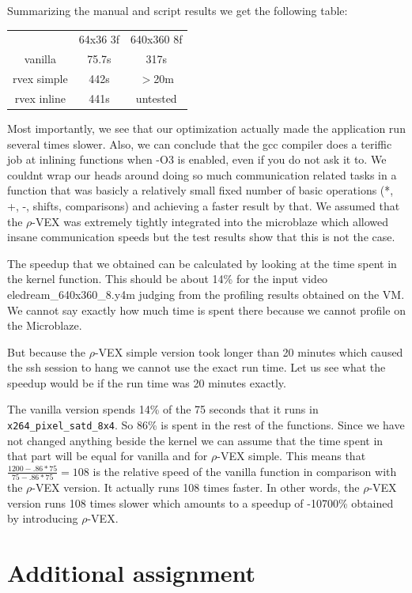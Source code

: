 \documentclass{article}
\newcommand{\rvex}{\ensuremath{\rho}-VEX}
\newcommand{\satd}{\texttt{x264\_pixel\_satd\_8x4}}
\begin{document}
Summarizing the manual and script results we get the following table:

\begin{tabular}{ c | c c }
   & 64x36 3f & 640x360 8f \\
   vanilla & 75.7s & 317s \\
   rvex simple & 442s & $>$20m \\
   rvex inline & 441s & untested \\
\end{tabular}

Most importantly, we see that our optimization actually made the application run several times slower. 
Also, we can conclude that the gcc compiler does a teriffic job at inlining functions when -O3 is enabled, even if you do not ask it to. 
We couldnt wrap our heads around doing so much communication related tasks in a function that was basicly a relatively small fixed number of basic operations (*, +, -, shifts, comparisons) and achieving a faster result by that. 
We assumed that the \rvex{} was extremely tightly integrated into the microblaze which allowed insane communication speeds but the test results show that this is not the case. 

The speedup that we obtained can be calculated by looking at the time spent in the kernel function. 
This should be about 14\% for the input video eledream\_640x360\_8.y4m judging from the profiling results obtained on the VM. 
We cannot say exactly how much time is spent there because we cannot profile on the Microblaze. 

But because the \rvex{} simple version took longer than 20 minutes which caused the ssh session to hang we cannot use the exact run time. 
Let us see what the speedup would be if the run time was 20 minutes exactly. 

The vanilla version spends 14\% of the 75 seconds that it runs in \satd{}. So 86\% is spent in the rest of the functions. 
Since we have not changed anything beside the kernel we can assume that the time spent in that part will be equal for vanilla and for \rvex{} simple. 
This means that $\frac{1200 - .86*75}{75 - .86*75} = 108$ is the relative speed of the vanilla function in comparison with the \rvex{} version. 
It actually runs 108 times faster. 
In other words, the \rvex{} version runs 108 times slower which amounts to a speedup of -10700\% obtained by introducing \rvex{}. 

\section{Additional assignment}
\end{document}
